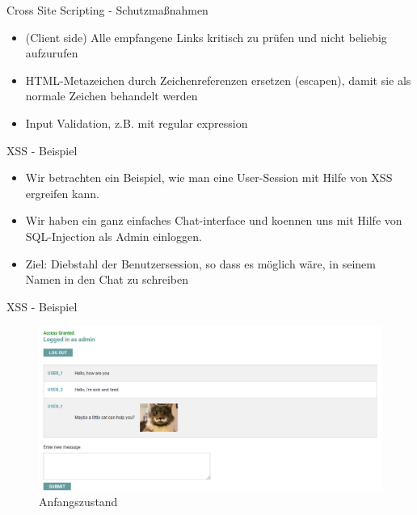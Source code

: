 \documentclass[10pt]{beamer}
\begin{document}
\begin{frame}[fragile]{Cross Site Scripting - Schutzma{\ss}nahmen}
  \begin{itemize}
    \item (Client side) Alle empfangene Links kritisch zu prüfen und nicht beliebig aufzurufen
    \item HTML-Metazeichen durch Zeichenreferenzen ersetzen (escapen), damit sie als normale Zeichen behandelt werden
    \item Input Validation, z.B. mit regular expression
  \end{itemize}
\end{frame}

\begin{frame}[fragile]{XSS - Beispiel}
  \begin{itemize}
    \item Wir betrachten ein Beispiel, wie man eine User-Session mit Hilfe von XSS ergreifen kann.
    \item Wir haben ein ganz einfaches Chat-interface und koennen uns mit Hilfe von SQL-Injection als Admin einloggen.
    \item Ziel: Diebstahl der Benutzersession, so dass es m\"oglich w\"are, in seinem Namen in den Chat zu schreiben
  \end{itemize}
\end{frame}


\begin{frame}[fragile]{XSS - Beispiel}
  \begin{figure}[ht]
      \centering
      \includegraphics[width=\textwidth]{XSS-1.png}
      \caption{Anfangszustand}
      \label{fig:figure1}
  \end{figure}
\end{frame}
\end{document}
